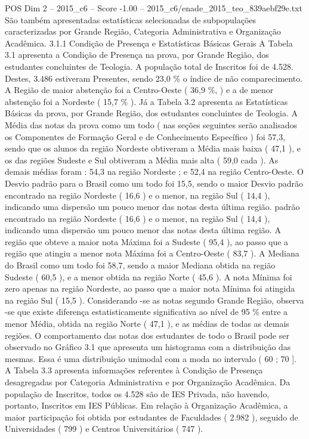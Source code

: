\begin{textsample}{POS Dim 2 – 2015\_c6 – Score -1.00 – 2015\_c6/enade\_2015\_teo\_839aebf29e.txt}
São também apresentadas estatísticas selecionadas de subpopulações caracterizadas por Grande Região, Categoria Administrativa e Organização Acadêmica. 3.1.1 Condição de Presença e Estatísticas Básicas Gerais A Tabela 3.1 apresenta a Condição de Presença na prova, por Grande Região, dos estudantes concluintes de Teologia.
A população total de Inscritos foi de 4.528.
Destes, 3.486 estiveram Presentes, sendo 23,0 \% o índice de não comparecimento.
A Região de maior abstenção foi a Centro-Oeste ( 36,9 \%, ) e a de menor abstenção foi a Nordeste ( 15,7 \% ).
Já a Tabela 3.2 apresenta as Estatísticas Básicas da prova, por Grande Região, dos estudantes concluintes de Teologia.
A Média das notas da prova como um todo ( nas seções seguintes serão analisados os Componentes de Formação Geral e de Conhecimento Específico ) foi 57,3, sendo que os alunos da região Nordeste obtiveram a Média mais baixa ( 47,1 ), e os das regiões Sudeste e Sul obtiveram a Média mais alta ( 59,0 cada ).
As demais médias foram : 54,3 na região Nordeste ; e 52,4 na região Centro-Oeste.
O Desvio padrão para o Brasil como um todo foi 15,5, sendo o maior Desvio padrão encontrado na região Nordeste ( 16,6 ) e o menor, na região Sul ( 14,4 ), indicando uma dispersão um pouco menor das notas desta última região. padrão encontrado na região Nordeste ( 16,6 ) e o menor, na região Sul ( 14,4 ), indicando uma dispersão um pouco menor das notas desta última região.
A região que obteve a maior nota Máxima foi a Sudeste ( 95,4 ), ao passo que a região que atingiu a menor nota Máxima foi a Centro-Oeste ( 83,7 ).
A Mediana do Brasil como um todo foi 58,7, sendo a maior Mediana obtida na região Sudeste ( 60,5 ), e a menor obtida na região Norte ( 45,6 ).
A nota Mínima foi zero apenas na região Nordeste, ao passo que a maior nota Mínima foi atingida na região Sul ( 15,5 ).
Considerando -se as notas segundo Grande Região, observa -se que existe diferença estatisticamente significativa ao nível de 95 \% entre a menor Média, obtida na região Norte ( 47,1 ), e as médias de todas as demais regiões.
O comportamento das notas dos estudantes de todo o Brasil pode ser observado no Gráfico 3.1 que apresenta um histograma com a distribuição das mesmas.
Essa é uma distribuição unimodal com a moda no intervalo ( 60 ; 70 ].
A Tabela 3.3 apresenta informações referentes à Condição de Presença desagregadas por Categoria Administrativa e por Organização Acadêmica.
Da população de Inscritos, todos os 4.528 são de IES Privada, não havendo, portanto, Inscritos em IES Públicas.
Em relação à Organização Acadêmica, a maior participação foi obtida por estudantes de Faculdades ( 2.982 ), seguido de Universidades ( 799 ) e Centros Universitários ( 747 ).

\end{textsample}
